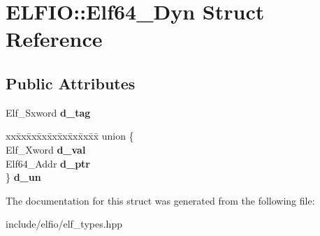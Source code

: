 \hypertarget{struct_e_l_f_i_o_1_1_elf64___dyn}{}\section{E\+L\+F\+IO\+:\+:Elf64\+\_\+\+Dyn Struct Reference}
\label{struct_e_l_f_i_o_1_1_elf64___dyn}
\subsection*{Public Attributes}
\begin{DoxyCompactItemize}
\item 
Elf\+\_\+\+Sxword {\bfseries d\+\_\+tag}\hypertarget{struct_e_l_f_i_o_1_1_elf64___dyn_ab206d983194fbfc44ce33afb9d62b6b5}{}\label{struct_e_l_f_i_o_1_1_elf64___dyn_ab206d983194fbfc44ce33afb9d62b6b5}

\item 
\begin{tabbing}
xx\=xx\=xx\=xx\=xx\=xx\=xx\=xx\=xx\=\kill
union \{\\
\>Elf\_Xword {\bfseries d\_val}\\
\>Elf64\_Addr {\bfseries d\_ptr}\\
\} {\bfseries d\_un}\hypertarget{struct_e_l_f_i_o_1_1_elf64___dyn_a1ed67ee36f5dd890fa9665d59d2b374b}{}\label{struct_e_l_f_i_o_1_1_elf64___dyn_a1ed67ee36f5dd890fa9665d59d2b374b}
\\

\end{tabbing}\end{DoxyCompactItemize}


The documentation for this struct was generated from the following file\+:\begin{DoxyCompactItemize}
\item 
include/elfio/elf\+\_\+types.\+hpp\end{DoxyCompactItemize}
